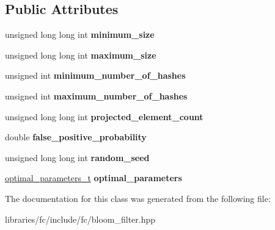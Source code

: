 \subsection*{Public Attributes}
\begin{DoxyCompactItemize}
\item 
\mbox{\label{classfc_1_1bloom__parameters_ae15368c79b3db9bca7be74366427cec4}} 
unsigned long long int {\bfseries minimum\+\_\+size}
\item 
\mbox{\label{classfc_1_1bloom__parameters_a0b7eb28568022eee7b121dc2408f9609}} 
unsigned long long int {\bfseries maximum\+\_\+size}
\item 
\mbox{\label{classfc_1_1bloom__parameters_ad8e06579adc96b2bc5b77afccf2ea7a0}} 
unsigned int {\bfseries minimum\+\_\+number\+\_\+of\+\_\+hashes}
\item 
\mbox{\label{classfc_1_1bloom__parameters_aaf04cb34dca7cff777b669a870c06839}} 
unsigned int {\bfseries maximum\+\_\+number\+\_\+of\+\_\+hashes}
\item 
\mbox{\label{classfc_1_1bloom__parameters_a5fe45e27cfb6da91e99cf8001c063a7b}} 
unsigned long long int {\bfseries projected\+\_\+element\+\_\+count}
\item 
\mbox{\label{classfc_1_1bloom__parameters_a8b233dcb59ab35d000673c6c99f135ea}} 
double {\bfseries false\+\_\+positive\+\_\+probability}
\item 
\mbox{\label{classfc_1_1bloom__parameters_a4cf047e8014a53cbacb96755cad0c805}} 
unsigned long long int {\bfseries random\+\_\+seed}
\item 
\mbox{\label{classfc_1_1bloom__parameters_a67b1a7f1a897fd60c84ade0c732c73dd}} 
\mbox{\hyperlink{structfc_1_1bloom__parameters_1_1optimal__parameters__t}{optimal\+\_\+parameters\+\_\+t}} {\bfseries optimal\+\_\+parameters}
\end{DoxyCompactItemize}


The documentation for this class was generated from the following file\+:\begin{DoxyCompactItemize}
\item 
libraries/fc/include/fc/bloom\+\_\+filter.\+hpp\end{DoxyCompactItemize}
